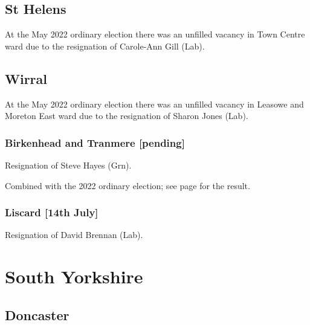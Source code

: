 \documentclass[a4paper,openany]{book}
\begin{document}
\begin{resultsiii}
\subsection*{St Helens}

At the May 2022 ordinary election there was an unfilled vacancy in Town Centre ward due to the resignation of Carole-Ann Gill (Lab).%

\subsection*{Wirral}

At the May 2022 ordinary election there was an unfilled vacancy in Leasowe and Moreton East ward due to the resignation of Sharon Jones (Lab).%

\subsubsection*{Birkenhead and Tranmere \hspace*{\fill}\nolinebreak[1]%
	\enspace\hspace*{\fill}
	[pending]}


Resignation of Steve Hayes (Grn).

Combined with the 2022 ordinary election; see page \pageref{WirralBirkenheadTranmere} for the result.

\subsubsection*{Liscard \hspace*{\fill}\nolinebreak[1]%
	\enspace\hspace*{\fill}
	[14th July]}


Resignation of David Brennan (Lab).

\section{South Yorkshire}

\subsection*{Doncaster}


\end{resultsiii}
\end{document}
